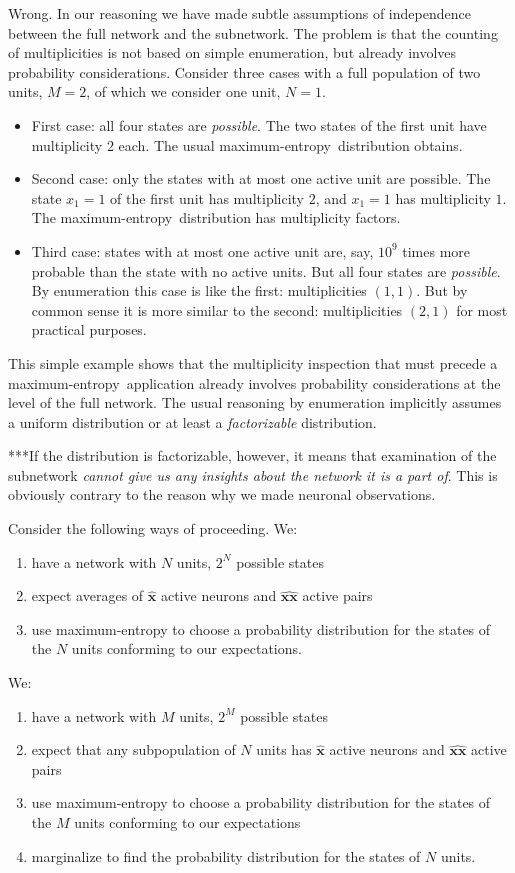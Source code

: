 \documentclass{article}
\newcommand*{\sav}{\widehat} %
\newcommand*{\yxx}{x}
\newcommand*{\yx}{\bm{\yxx}}%
\newcommand*{\yxs}{\sav{\yx}}%
\newcommand*{\yxxs}{\sav{\yx\yx}}
\newcommand*{\yN}{N}
\newcommand*{\yM}{M}
\newcommand*{\me}{maximum-entropy}
\begin{document}
Wrong. In our reasoning we have made subtle assumptions of independence
between the full network and the subnetwork. The problem is that the
counting of multiplicities is not based on simple enumeration, but already
involves probability considerations. Consider three cases with a full
population of two units, $\yM=2$, of which we consider one unit, $\yN=1$.
\begin{itemize}
\item First case: all four states are \emph{possible}. The two states of
  the first unit have multiplicity $2$ each. The usual \me\ distribution
  obtains.
\item Second case: only the states with at most one active unit are
  possible. The state $\yxx_1=1$ of the first unit has multiplicity
  $2$, and $\yxx_1=1$ has multiplicity $1$. The \me\ distribution has
  multiplicity factors.
\item Third case: states with at most one active unit are, say, $10^{9}$
  times more probable than the state with no active units. But all four
  states are \emph{possible}. By enumeration this case is like the first:
  multiplicities $(1,1)$. But by common sense it is more similar to the
  second: multiplicities $(2,1)$ for most practical purposes.
\end{itemize}

This simple example shows that the multiplicity inspection that must
precede a \me\ application already involves probability considerations at
the level of the full network. The usual reasoning by enumeration
implicitly assumes a uniform distribution or at least a \emph{factorizable}
distribution.

***If the distribution is factorizable, however, it means that examination of
the subnetwork \emph{cannot give us any insights about the network it is a
  part of}. This is obviously contrary to the reason why we made neuronal observations.

Consider the following ways of proceeding. We:
\begin{enumerate}
\item have a network with $\yN$ units, $2^{\yN}$ possible states
\item expect averages of $\yxs$ active neurons and $\yxxs$ active pairs
\item use maximum-entropy to choose a probability distribution for the
  states of the $\yN$ units conforming to our expectations.
\end{enumerate}

We:
\begin{enumerate}
\item have a network with $\yM$ units, $2^{\yM}$ possible states
\item expect that any subpopulation of $\yN$ units has $\yxs$ active
  neurons and $\yxxs$ active pairs
\item use maximum-entropy to choose a probability distribution for the
  states of the $\yM$ units conforming to our expectations
\item marginalize to find the probability distribution for the states of
  $\yN$ units.
\end{enumerate}
\end{document}
